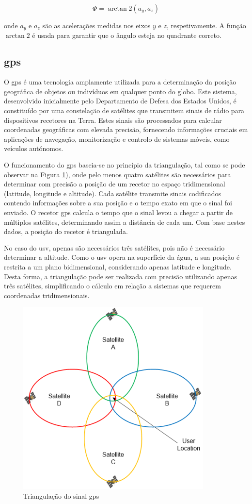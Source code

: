 \begin{equation}
    \Phi = \arctan2{\left(a_y, a_z\right)}
    \label{eq:roll}
\end{equation}

onde \(a_y\) e \(a_z\) são as acelerações medidas nos eixos \(y\) e \(z\), respetivamente. A função \(\arctan2\) é usada para garantir que o ângulo esteja no quadrante correto.

\subsection{\acrfull{gps}} \label{subsec:gps}

O \gls{gps} é uma tecnologia amplamente utilizada para a determinação da posição geográfica de objetos ou indivíduos em qualquer ponto do globo. Este sistema, desenvolvido inicialmente pelo Departamento de Defesa dos Estados Unidos, é constituído por uma constelação de satélites que transmitem sinais de rádio para dispositivos recetores na Terra. Estes sinais são processados para calcular coordenadas geográficas com elevada precisão, fornecendo informações cruciais em aplicações de navegação, monitorização e controlo de sistemas móveis, como veículos autónomos.

O funcionamento do \gls{gps} baseia-se no princípio da triangulação, tal como se pode observar na Figura \ref{fig:triangulacao}), onde pelo menos quatro satélites são necessários para determinar com precisão a posição de um recetor no espaço tridimensional (latitude, longitude e altitude). Cada satélite transmite sinais codificados contendo informações sobre a sua posição e o tempo exato em que o sinal foi enviado. O recetor \gls{gps} calcula o tempo que o sinal levou a chegar a partir de múltiplos satélites, determinando assim a distância de cada um. Com base nestes dados, a posição do recetor é triangulada. 

No caso do \gls{usv}, apenas são necessários três satélites, pois não é necessário determinar a altitude. Como o \gls{usv} opera na superfície da água, a sua posição é restrita a um plano bidimensional, considerando apenas latitude e longitude. Desta forma, a triangulação pode ser realizada com precisão utilizando apenas três satélites, simplificando o cálculo em relação a sistemas que requerem coordenadas tridimensionais.

\begin{figure}[H]
    \centering
    \includegraphics[width=0.33\linewidth]{figuras/lowdop.png}
    \caption[Triangulação do sinal \gls{gps}]{Triangulação do sinal \gls{gps} \cite{help-gps}}
    \label{fig:triangulacao}
\end{figure}

